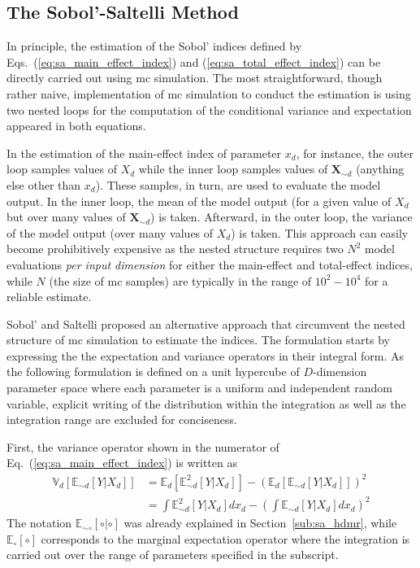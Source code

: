 \subsection{The Sobol'-Saltelli Method}\label{sub:sa_sobol_saltelli}

In principle, the estimation of the Sobol' indices defined by Eqs.~(\ref{eq:sa_main_effect_index}) and (\ref{eq:sa_total_effect_index}) can be directly carried out using \gls{mc} simulation.
The most straightforward, though rather naive, 
implementation of \gls{mc} simulation to conduct the estimation is using two nested loops for the computation of the conditional variance and expectation appeared in both equations.

In the estimation of the main-effect index of parameter $x_d$, for instance, 
the outer loop samples values of $X_d$ while the inner loop samples values of $\mathbf{X}_{\sim d}$ (anything else other than $x_d$).
These samples, in turn, are used to evaluate the model output.
In the inner loop, the mean of the model output (for a given value of $X_d$ but over many values of $\mathbf{X}_{\sim d}$) is taken. 
Afterward, in the outer loop, the variance of the model output (over many values of $X_d$) is taken.
This approach can easily become prohibitively expensive as the nested structure requires two $N^2$ model evaluations \emph{per input dimension} for either the main-effect and total-effect indices, 
while $N$ (the size of \gls{mc} samples) are typically in the range of $10^2 - 10^4$ for a reliable estimate. 
   
Sobol' \cite{Sobol2001} and Saltelli \cite{Saltelli2002} proposed an alternative approach that circumvent the nested structure of \gls{mc} simulation to estimate the indices.
The formulation starts by expressing the the expectation and variance operators in their integral form.
As the following formulation is defined on a unit hypercube of $D$-dimension parameter space where each parameter is a uniform and independent random variable,
explicit writing of the distribution within the integration as well as the integration range are excluded for conciseness.

First, the variance operator shown in the numerator of Eq.~(\ref{eq:sa_main_effect_index}) is written as
\begin{equation}
  \begin{split}
    \mathbb{V}_{d}[\mathbb{E}_{\sim d}[Y|X_d]] & = \mathbb{E}_{d}[\mathbb{E}_{\sim d}^{2}[Y|X_d]] - \left(\mathbb{E}_{d}[\mathbb{E}_{\sim d}[Y|X_d]]\right)^2 \\ 
                                               & = \int \mathbb{E}_{\sim d}^{2}[Y|X_d] dx_d - \left(\int \mathbb{E}_{\sim d}[Y|X_d] dx_d\right)^2
  \end{split}
\label{eq:ss_variance_integral}
\end{equation}
The notation $\mathbb{E}_{\sim \circ}[\circ | \circ]$ was already explained in Section~\ref{sub:sa_hdmr}, 
while $\mathbb{E}_{\circ} [\circ]$ corresponds to the marginal expectation operator 
where the integration is carried out over the range of parameters specified in the subscript. 

